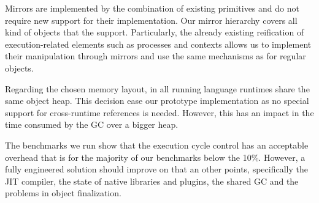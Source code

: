 Mirrors are implemented by the combination of existing \VM primitives and do not require new \VM support for their implementation. Our mirror hierarchy covers all kind of objects that the \VM support. Particularly, the already existing reification of execution-related elements such as processes and contexts allows us to implement their manipulation through mirrors and use the same mechanisms as for regular objects.

Regarding the chosen memory layout, in \Vtt all running language runtimes share the same object heap. This decision ease our prototype implementation as no special support for cross-runtime references is needed. However, this has an impact in the time consumed by the GC over a bigger heap.

The benchmarks we run show that the execution cycle control has an acceptable overhead that is for the majority of our benchmarks below the 10\%. However, a fully engineered solution should improve on that an other points, specifically the JIT compiler, the state of native libraries and plugins, the shared GC and the problems in object finalization.

